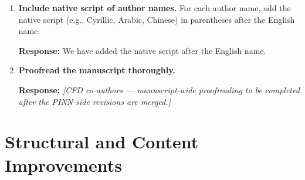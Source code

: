 \documentclass[11pt]{article}
\begin{document}
\begin{enumerate}[label=\textbf{\arabic*.}, leftmargin=*]
\item \textbf{Include native script of author names.}
  For each author name, add the native script (e.g., Cyrillic, Arabic, Chinese) in parentheses after the English name.

 \textbf{Response:} We have added the native script after the English name.

\item \textbf{Proofread the manuscript thoroughly.}

  \textbf{Response:} \textit{[CFD co-authors --- manuscript-wide proofreading to be completed after the PINN-side revisions are merged.]}
  \vspace{0.5cm}

\end{enumerate}

\section*{Structural and Content Improvements}
\end{document}
